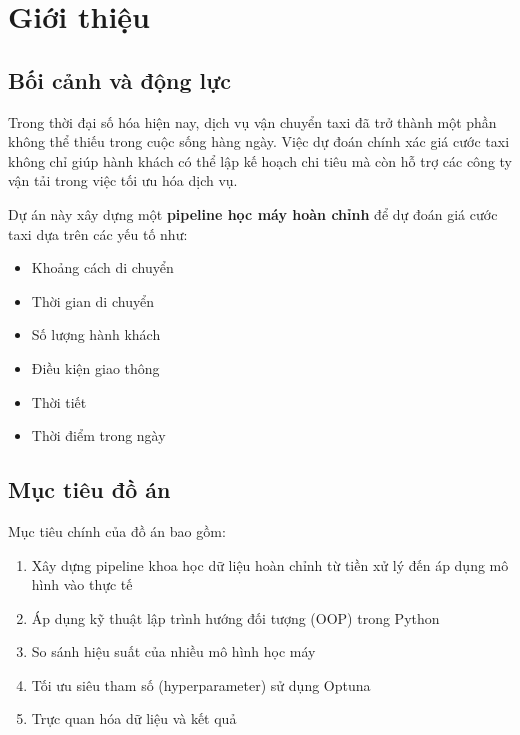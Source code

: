 \documentclass[12pt,a4paper]{article}
\begin{document}
\tableofcontents
\newpage

\listoffigures
\newpage

\listoftables
\newpage

\section{Giới thiệu}

\subsection{Bối cảnh và động lực}

Trong thời đại số hóa hiện nay, dịch vụ vận chuyển taxi đã trở thành một phần không thể thiếu trong cuộc sống hàng ngày. Việc dự đoán chính xác giá cước taxi không chỉ giúp hành khách có thể lập kế hoạch chi tiêu mà còn hỗ trợ các công ty vận tải trong việc tối ưu hóa dịch vụ.

Dự án này xây dựng một \textbf{pipeline học máy hoàn chỉnh} để dự đoán giá cước taxi dựa trên các yếu tố như:
\begin{itemize}
    \item Khoảng cách di chuyển
    \item Thời gian di chuyển
    \item Số lượng hành khách
    \item Điều kiện giao thông
    \item Thời tiết
    \item Thời điểm trong ngày
\end{itemize}

\subsection{Mục tiêu đồ án}

Mục tiêu chính của đồ án bao gồm:
\begin{enumerate}
    \item Xây dựng pipeline khoa học dữ liệu hoàn chỉnh từ tiền xử lý đến áp dụng mô hình vào thực tế 
    \item Áp dụng kỹ thuật lập trình hướng đối tượng (OOP) trong Python
    \item So sánh hiệu suất của nhiều mô hình học máy
    \item Tối ưu siêu tham số (hyperparameter) sử dụng Optuna
    \item Trực quan hóa dữ liệu và kết quả
\end{enumerate}
\end{document}
